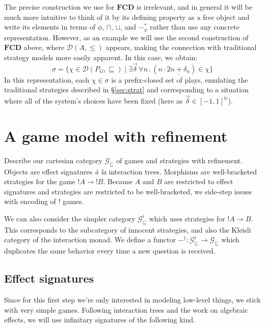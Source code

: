 \documentclass[format=sigplan,authordraft]{acmart}
\newcommand{\gcat}{\mathcal{G}_{\sqsubseteq}}
\begin{document}
The precise construction we use for $\mathbf{FCD}$ is irrelevant,
and in general it will be much more intuitive
to think of it by its defining property as a free object and
write its elements in terms of $\phi$, $\sqcap$, $\sqcup$, and $-_\phi^*$
rather than use any concrete representation.
However, as an example
we will use the second construction of $\mathbf{FCD}$ above,
where $\mathcal{D}(A, {\le})$ appears,
making the connection with traditional strategy models
more easily apparent.
In this case, we obtain:
\[
    \sigma =
    \{ \chi \in \mathcal{D}(P_G, {\sqsubseteq}) \mid
       \exists \vec{\delta} \,
       \forall n \,.\,
       (n \cdot \underline{2n + \delta_n}) \in \chi \}
\]
In this representation,
each $\chi \in \sigma$
is a prefix-closed set of plays,
emulating the traditional strategies described in \S\ref{sec:strat}
and corresponding to a situation where all of the system's choices
have been fixed (here as $\vec{\delta} \in [-1,1]^\mathbb{N}$).



\section{A game model with refinement} %

Describe our cartesian category $\gcat$
of games and strategies with refinement.
Objects are effect signatures \emph{\`a la} interaction trees.
Morphisms are well-bracketed strategies for
the game ${!A} \multimap {!B}$.
Because $A$ and $B$ are restricted to effect signatures and
strategies are restricted to be well-bracketed,
we side-step issues with encoding of $!$ games.

We can also consider the simpler category
$\gcat^i$
which uses strategies for ${!A} \multimap B$.
This corresponds to the subcategory of innocent strategies,
and also the Kleisli category of the interaction monad.
We define a functor
$-^\dagger : \gcat^i \rightarrow \gcat$
which duplicates the same behavior
every time a new question is received.

\subsection{Effect signatures} %

Since for this first step
we're only interested in modeling
low-level things,
we stick with very simple games.
Following interaction trees and the work on
algebraic effects,
we will use infinitary signatures of the following kind.
\end{document}
